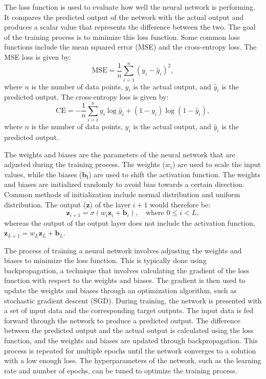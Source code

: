\documentclass[10pt]{article}
\begin{document}
The loss function is used to evaluate how well the neural network is performing. It compares the predicted output of the network with the actual output and produces a scalar value that represents the difference between the two. The goal of the training process is to minimize this loss function. Some common loss functions include the mean squared error (MSE) and the cross-entropy loss. The MSE loss is given by:
\begin{equation*}
\text{MSE} = \frac{1}{n} \sum_{i=1}^{n} (y_i - \hat{y}_i)^2,
\end{equation*}
where $n$ is the number of data points, $y_i$ is the actual output, and $\hat{y}_i$ is the predicted output. The cross-entropy loss is given by:
\begin{equation*}
\text{CE} = -\frac{1}{n} \sum_{i=1}^{n} y_i \log{\hat{y}_i} + (1 - y_i) \log{(1 - \hat{y}_i)},
\end{equation*}
where $n$ is the number of data points, $y_i$ is the actual output, and $\hat{y}_i$ is the predicted output.

The weights and biases are the parameters of the neural network that are adjusted during the training process. The weights ($w_i$) are used to scale the input values, while the biases ($\mathbf{b_i}$) are used to shift the activation function. The weights and biases are initialized randomly to avoid bias towards a certain direction. Common methods of initialization include normal distribution and uniform distribution. The output ($\mathbf{z}$) of the layer $i+1$ would therefore be:
\begin{equation}
\mathbf{z}_{i+1} = \sigma(w_i \mathbf{z}_i + \mathbf{b}_i),\quad\text{where } 0 \leq i < L,
\end{equation}
whereas the output of the output layer does not include the activation function, $\mathbf{z}_{L+1} = w_L \mathbf{z}_
L + \mathbf{b}_L$.

The process of training a neural network involves adjusting the weights and biases to minimize the loss function. This is typically done using backpropagation, a technique that involves calculating the gradient of the loss function with respect to the weights and biases. The gradient is then used to update the weights and biases through an optimization algorithm, such as stochastic gradient descent (SGD). During training, the network is presented with a set of input data and the corresponding target outputs. The input data is fed forward through the network to produce a predicted output. The difference between the predicted output and the actual output is calculated using the loss function, and the weights and biases are updated through backpropagation. This process is repeated for multiple epochs until the network converges to a solution with a low enough loss. The hyperparameters of the network, such as the learning rate and number of epochs, can be tuned to optimize the training process.
\end{document}
